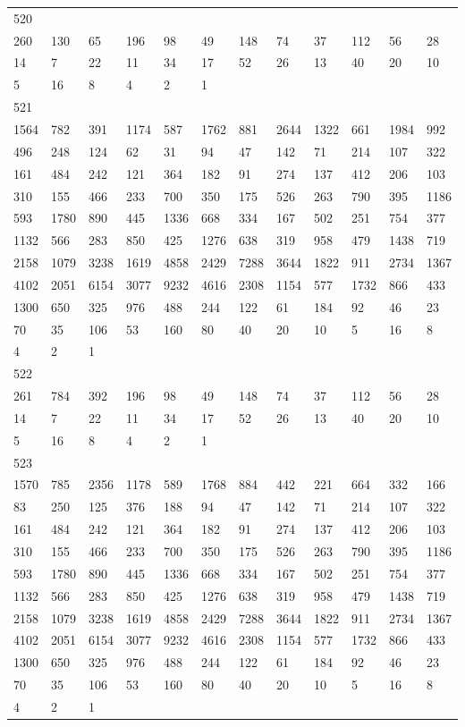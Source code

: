 \begin{longtable}{llllllllllll}
520&&&&&&&&&&&\\
260& 130& 65& 196& 98& 49& 148& 74& 37& 112& 56& 28\\
14& 7& 22& 11& 34& 17& 52& 26& 13& 40& 20& 10\\
5& 16& 8& 4& 2& 1& \\

521&&&&&&&&&&&\\
1564& 782& 391& 1174& 587& 1762& 881& 2644& 1322& 661& 1984& 992\\
496& 248& 124& 62& 31& 94& 47& 142& 71& 214& 107& 322\\
161& 484& 242& 121& 364& 182& 91& 274& 137& 412& 206& 103\\
310& 155& 466& 233& 700& 350& 175& 526& 263& 790& 395& 1186\\
593& 1780& 890& 445& 1336& 668& 334& 167& 502& 251& 754& 377\\
1132& 566& 283& 850& 425& 1276& 638& 319& 958& 479& 1438& 719\\
2158& 1079& 3238& 1619& 4858& 2429& 7288& 3644& 1822& 911& 2734& 1367\\
4102& 2051& 6154& 3077& 9232& 4616& 2308& 1154& 577& 1732& 866& 433\\
1300& 650& 325& 976& 488& 244& 122& 61& 184& 92& 46& 23\\
70& 35& 106& 53& 160& 80& 40& 20& 10& 5& 16& 8\\
4& 2& 1& \\

522&&&&&&&&&&&\\
261& 784& 392& 196& 98& 49& 148& 74& 37& 112& 56& 28\\
14& 7& 22& 11& 34& 17& 52& 26& 13& 40& 20& 10\\
5& 16& 8& 4& 2& 1& \\

523&&&&&&&&&&&\\
1570& 785& 2356& 1178& 589& 1768& 884& 442& 221& 664& 332& 166\\
83& 250& 125& 376& 188& 94& 47& 142& 71& 214& 107& 322\\
161& 484& 242& 121& 364& 182& 91& 274& 137& 412& 206& 103\\
310& 155& 466& 233& 700& 350& 175& 526& 263& 790& 395& 1186\\
593& 1780& 890& 445& 1336& 668& 334& 167& 502& 251& 754& 377\\
1132& 566& 283& 850& 425& 1276& 638& 319& 958& 479& 1438& 719\\
2158& 1079& 3238& 1619& 4858& 2429& 7288& 3644& 1822& 911& 2734& 1367\\
4102& 2051& 6154& 3077& 9232& 4616& 2308& 1154& 577& 1732& 866& 433\\
1300& 650& 325& 976& 488& 244& 122& 61& 184& 92& 46& 23\\
70& 35& 106& 53& 160& 80& 40& 20& 10& 5& 16& 8\\
4& 2& 1& \\


\end{longtable}
